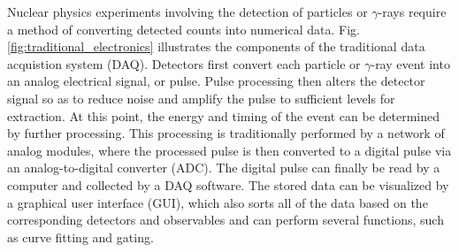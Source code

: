 Nuclear physics experiments involving the detection of particles or $\gamma$-rays require a method of converting detected counts into numerical data. 
Fig. \ref{fig:traditional_electronics} illustrates the components of the traditional data acquistion system (DAQ). Detectors first convert each particle or $\gamma$-ray event into an analog electrical signal, or pulse. Pulse processing then alters the detector signal so as to reduce noise and amplify the pulse to sufficient levels for extraction. At this point, the energy and timing of the event can be determined by further processing. This processing is traditionally performed by a network of analog modules, where the processed pulse is then converted to a digital pulse via an analog-to-digital converter (ADC). The digital pulse can finally be read by a computer and collected by a DAQ software. The stored data can be visualized by a graphical user interface (GUI), which also sorts all of the data based on the corresponding detectors and observables and can perform several functions, such as curve fitting and gating.

